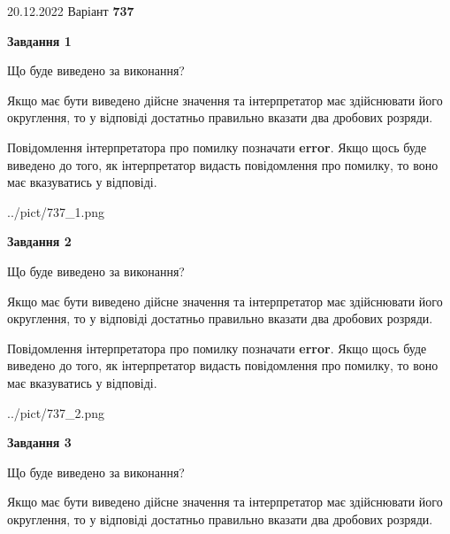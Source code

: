 \documentclass[12pt, ukrainian]{article}
\begin{document}
{20.12.2022 Варіант \No \textbf { 737 }\par}
{
\begin {Large}

{\begin {center}\textbf{Завдання 1}\end {center}}\par
Що буде виведено за виконання? \par

Якщо має бути виведено дійсне значення та інтерпретатор має здійснювати його округлення, 
то у відповіді достатньо правильно вказати два дробових розряди.

Повідомлення інтерпретатора про помилку позначати \textbf{error}.
Якщо щось буде виведено до того, як інтерпретатор видасть повідомлення про помилку, 
то воно має вказуватись у відповіді. \par

\begin{center}
	{../pict/737_1.png}
\end{center}
\newpage

{\begin {center}\textbf{Завдання 2}\end {center}}\par
Що буде виведено за виконання? \par

Якщо має бути виведено дійсне значення та інтерпретатор має здійснювати його округлення, 
то у відповіді достатньо правильно вказати два дробових розряди.

Повідомлення інтерпретатора про помилку позначати \textbf{error}.
Якщо щось буде виведено до того, як інтерпретатор видасть повідомлення про помилку, 
то воно має вказуватись у відповіді. \par

\begin{center}
	{../pict/737_2.png}
\end{center}
\newpage

{\begin {center}\textbf{Завдання 3}\end {center}}\par
Що буде виведено за виконання? \par

Якщо має бути виведено дійсне значення та інтерпретатор має здійснювати його округлення, 
то у відповіді достатньо правильно вказати два дробових розряди.


\end{Large}}
\end{document}

